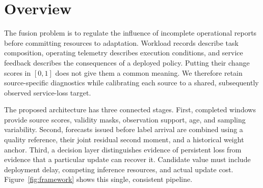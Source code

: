 \section{Overview}
\label{sec:overview}

The fusion problem is to regulate the influence of incomplete operational
reports before committing resources to adaptation. Workload records describe
task composition, operating telemetry describes execution conditions, and
service feedback describes the consequences of a deployed policy. Putting their
change scores in $[0,1]$ does not give them a common meaning. We therefore retain
source-specific diagnostics while calibrating each source to a shared,
subsequently observed service-loss target.

The proposed architecture has three connected stages. First, completed windows
provide source scores, validity masks, observation support, age, and sampling
variability. Second, forecasts issued before label arrival are combined using a
quality reference, their joint residual second moment, and a historical weight
anchor. Third, a decision layer distinguishes evidence of persistent loss from
evidence that a particular update can recover it. Candidate value must include
deployment delay, competing inference resources, and actual update cost.
Figure~\ref{fig:framework} shows this single, consistent pipeline.

